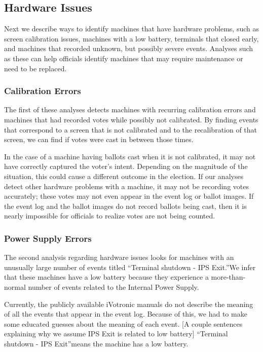 \subsection{Hardware Issues}
Next we describe ways to identify machines that have hardware problems, such as screen calibration issues, machines with a low battery, terminals that closed early, and machines that recorded unknown, but possibly severe events.  Analyses such as these can help officials identify machines that may require maintenance or need to be replaced.  

\subsubsection{Calibration Errors}
The first of these analyses detects machines with recurring calibration errors and machines that had recorded votes while possibly not calibrated.  By finding events that correspond to a screen that is not calibrated and to the recalibration of that screen, we can find if votes were cast in between those times.

In the case of a machine having ballots cast when it is not calibrated, it may not have correctly captured the voter's intent.  Depending on the magnitude of the situation, this could cause a different outcome in the election.  If our analyses detect other hardware problems with a machine, it may not be recording votes accurately; these votes may not even appear in the event log or ballot images.  If the event log and the ballot images do not record ballots being cast, then it is nearly impossible for officials to realize votes are not being counted.  

\subsubsection{Power Supply Errors}
The second analysis regarding hardware issues looks for machines with an unusually large number of events titled \textquotedblleft Terminal shutdown - IPS Exit.\textquotedblright  We infer that these machines have a low battery because they experience a more-than-normal number of events related to the Internal Power Supply.  

Currently, the publicly available iVotronic manuals do not describe the meaning of all the events that appear in the event log.  Because of this, we had to make some educated guesses about the meaning of each event.  [A couple sentences explaining why we assume IPS Exit is related to low battery] \textquotedblleft Terminal shutdown - IPS Exit\textquotedblright means the machine has a low battery.


